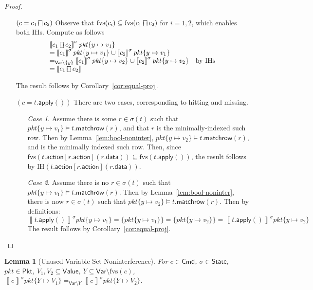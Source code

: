 \documentclass{article}
\newcommand{\pkt}{\mathit{pkt}}
\newcommand{\denote}[1]{\left\llbracket#1\right\rrbracket}
\newcommand{\Value}{\mathsf{Value}}
\newcommand{\Cmd}{\mathsf{Cmd}}
\newcommand{\Pkt}{\mathsf{Pkt}}
\newcommand{\Var}{\mathsf{Var}}
\newcommand{\State}{\mathsf{State}}
\newcommand{\action}{\mathsf{action}}
\newcommand{\data}{\mathsf{data}}
\newcommand{\apply}{\mathsf{apply}}
\newcommand{\choiceop}{\rotatebox[origin=c]{90}{$\sqsubset\!\!\!\sqsupset$}}
\newcommand{\choice}{\mathbin{\choiceop}}
\newcommand{\fvs}{\textrm{fvs}}
\newcommand{\matchrow}{\mathsf{matchrow}}
\theoremstyle{plain}
\newtheorem{lemma}{Lemma}
\theoremstyle{definition}
\theoremstyle{remark}
\begin{document}
\begin{proof}
\begin{enumerate}[align=left]
    \item[$(c = c_1 \choice c_2)$] Observe that $\fvs(c_i) \subseteq \fvs(c_1 \choice c_2)$ for
      $i = 1,2$, which enables both IHs. Compute as follows
      \[\begin{array}{ll}
      \denote{c_1 \choice c_2}^\sigma\pkt\{y \mapsto v_1\} \\
      = \denote{c_1}^\sigma\pkt\{y \mapsto v_1\} \cup \denote{c_2}^\sigma\pkt\{y \mapsto v_1\} \\
      =_{\Var \setminus \{y\}} \denote{c_1}^\sigma\pkt\{y \mapsto v_2\} \cup \denote{c_2}^\sigma\pkt\{y \mapsto v_2\}
      & \text{by IHs} \\
      = \denote{c_1 \choice c_2}
      \end{array}
      \]

      The result follows by Corollary~\ref{cor:equal-proj}.

    \item[$(c = t.\apply())$]
      There are two cases, corresponding to hitting and missing.
      \begin{enumerate}[align=left]
      \item[\textit{Case 1}.] Assume there is some $r \in \sigma(t)$ such that
        $\pkt\{y \mapsto v_1\} \models t.\matchrow(r)$, and that $r$ is the
        minimally-indexed such row. Then by Lemma~\ref{lem:bool-noninter},
        $\pkt\{y \mapsto v_2\} \models t.\matchrow(r)$, and is the minimally indexed such row. Then, since
        $\fvs(t.\action[r.\action](r.\data)) \subseteq \fvs(t.\apply())$, the
        result follows by IH$(t.\action[r.\action](r.\data))$.

        \item[\textit{Case 2}.] Assume there is no $r \in \sigma(t)$ such that
          $\pkt\{y \mapsto v_1\} \models t.\matchrow(r)$. Then by
          Lemma~\ref{lem:bool-noninter}, there is now $r \in \sigma(t)$ such
          that $\pkt\{y \mapsto v_2\} \models t.\matchrow(r)$. Then by definitions:
          \[\denote{t.\apply()}^\sigma \pkt\{y \mapsto v_1\} = \{\pkt\{y \mapsto v_1\}\} = \{\pkt\{y \mapsto v_2\}\} = \denote{t.\apply()}^\sigma \pkt\{y \mapsto v_2\}\]
          The result follows by Corollary~\ref{cor:equal-proj}.
      \end{enumerate}

  \end{enumerate}
\end{proof}


\begin{lemma}[Unused Variable Set Noninterference]
  \label{lem:param-noninter-set}
  For $c \in \Cmd$, $\sigma \in \State$, $\pkt \in \Pkt$,
  $V_1,V_2 \subseteq \Value$, $Y \subseteq \Var \setminus \fvs(c)$,
  $\denote{c}^\sigma \pkt\{Y \mapsto V_1\} =_{\Var \setminus Y}\denote{c}^\sigma\pkt\{Y \mapsto V_2\}$.
\end{lemma}
\end{document}

